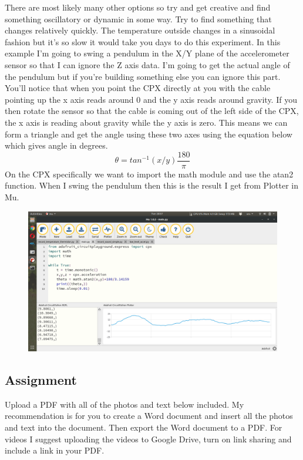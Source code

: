 There are most likely many other options so try and get creative and find something oscillatory or dynamic in some way. Try to find something that changes relatively quickly. The temperature outside changes in a sinusoidal fashion but it’s so slow it would take you days to do this experiment. 
In this example I'm going to swing a pendulum in the X/Y plane of the accelerometer sensor so that I can ignore the Z axis data. I'm going to get the actual angle of the pendulum but if you're building something else you can ignore this part. You’ll notice that when you point the CPX directly at you with the cable pointing up the x axis reads around 0 and the y axis reads around gravity. If you then rotate the sensor so that the cable is coming out of the left side of the CPX, the x axis is reading about gravity while the y axis is zero. This means we can form a triangle and get the angle using these two axes using the equation below which gives angle in degrees.
\begin{equation}
\theta = tan^{-1}(x/y)\frac{180}{\pi}
\end{equation}
On the CPX specifically we want to import the math module and use the atan2 function. When I swing the pendulum then this is the result I get from Plotter in Mu.
\begin{figure}[H]
  \begin{center}
    \includegraphics[width=\textwidth]{Figures/oscillation_mu.png}
  \end{center}
\end{figure}

\subsection{Assignment}

Upload a PDF with all of the photos and text below included. My recommendation is for you to create a Word document and insert all the photos and text into the document. Then export the Word document to a PDF. For videos I suggest uploading the videos to Google Drive, turn on link sharing and include a link in your PDF.

